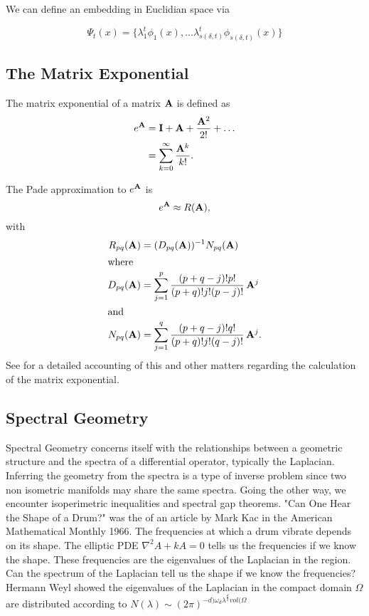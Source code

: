 We can define an embedding in Euclidian space via

\begin{equation}
\Psi_t (x) = \{ \lambda_{1}^{t} \phi_1(x) , ...  \lambda_{s(\delta,t)}^{t} \phi_{s(\delta,t)} (x) \}
\end{equation}

\subsection{The Matrix Exponential}
The matrix exponential of a matrix $\mathbf{A}$ is defined as
\begin{align*}
  e^{\mathbf{A}}
  &= \mathbf{I} + \mathbf{A} + \frac{\mathbf{A}^2}{2!} + \dots \\
  &= \sum_{k = 0}^\infty \frac{\mathbf{A}^k}{k!}.
\end{align*}

The Pade approximation to
$e^{\mathbf{A}}$ is
\begin{displaymath}
  e^{\mathbf{A}} \approx R(\mathbf{A}),
\end{displaymath}
with
\begin{align*}
  R_{pq} (\mathbf{A})
  &= (D_{pq}(\mathbf{A}))^{-1} N_{pq}(\mathbf{A}) \\
  \intertext{where}
  D_{pq}(\mathbf{A})
  &= \sum_{j=1}^p \frac{(p+q-j)! p!}{ (p+q)!j!(p-j)!}\, \mathbf{A}^j \\
  \intertext{and}
  N_{pq}(\mathbf{A})
  &= \sum_{j=1}^q \frac{(p+q-j)! q!}{ (p+q)!j!(q-j)!}\, \mathbf{A}^j.
\end{align*}
See \cite{Moler78nineteendubious} for a detailed accounting of this and other matters regarding the calculation of the matrix exponential.

\subsection{Spectral Geometry}
Spectral Geometry concerns itself with the relationships between a geometric structure and the spectra of a differential operator, typically the Laplacian.   Inferring the geometry from the spectra is a type of inverse problem since two non isometric manifolds may share the same spectra.  Going the other way, we encounter isoperimetric inequalities and spectral gap theorems.  "Can One Hear the Shape of a Drum?" was the of an article by Mark Kac in the American Mathematical Monthly 1966.   The frequencies at which a drum vibrate depends on its shape. The elliptic PDE  $ \nabla^2 A + k A = 0$ tells us the frequencies if we know the shape. These frequencies are the eigenvalues of the Laplacian in the region.  Can the spectrum of the Laplacian  tell us the shape if we know the frequencies?  Hermann Weyl showed the eigenvalues of the Laplacian in the compact domain $\Omega$ are distributed according to $ N(\lambda) \sim (2 \pi)^{-d) \omega_d \lambda^{\frac{d}{2}} vol(\Omega}$

